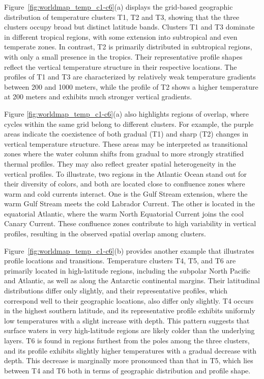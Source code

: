 \documentclass[11pt]{article}
\theoremstyle{plain}
\begin{document}
 

Figure~\ref{fig:worldmap_temp_c1-c6}(a) displays the grid-based geographic distribution of temperature clusters T1, T2 and T3, showing that the three clusters occupy broad but distinct latitude bands. Clusters T1 and T3 dominate in different tropical regions, with some extension into subtropical and even temperate zones. In contrast, T2 is primarily distributed in subtropical regions, with only a small presence in the tropics. Their representative profile shapes reflect the vertical temperature structure in their respective locations. The profiles of T1 and T3 are characterized by relatively weak temperature gradients between 200 and 1000 meters, while the profile of T2 shows a higher temperature at 200 meters and exhibits much stronger vertical gradients.

Figure \ref{fig:worldmap_temp_c1-c6}(a) also highlights regions of overlap, where cycles within the same grid belong to different clusters. For example, the purple areas indicate the coexistence of both gradual (T1) and sharp (T2) changes in vertical temperature structure. These areas may be interpreted as transitional zones where the water column shifts from gradual to more strongly stratified thermal profiles. They may also reflect greater spatial heterogeneity in the vertical profiles. To illustrate, two regions in the Atlantic Ocean stand out for their diversity of colors, and both are located close to confluence zones where warm and cold currents interact. One is the Gulf Stream extension, where the warm Gulf Stream meets the cold Labrador Current. The other is located in the equatorial Atlantic, where the warm North Equatorial Current joins the cool Canary Current. These confluence zones contribute to high variability in vertical profiles, resulting in the observed spatial overlap among clusters.



Figure~\ref{fig:worldmap_temp_c1-c6}(b) provides another example that illustrates profile locations and transitions. Temperature clusters T4, T5, and T6 are primarily located in high-latitude regions, including the subpolar North Pacific and Atlantic, as well as along the Antarctic continental margins. Their latitudinal distributions differ only slightly, and their representative profiles, which correspond well to their geographic locations, also differ only slightly. T4 occurs in the highest southern latitude,  and its representative profile exhibits uniformly low temperatures with a slight increase with depth. This pattern suggests that surface waters in very high-latitude regions are likely colder than the underlying layers. T6 is found in regions furthest from the poles among the three clusters, and its profile exhibits slightly higher temperatures with a gradual decrease with depth. This decrease is marginally more pronounced than that in T5, which lies between T4 and T6 both in terms of geographic distribution and profile shape.
\end{document}
